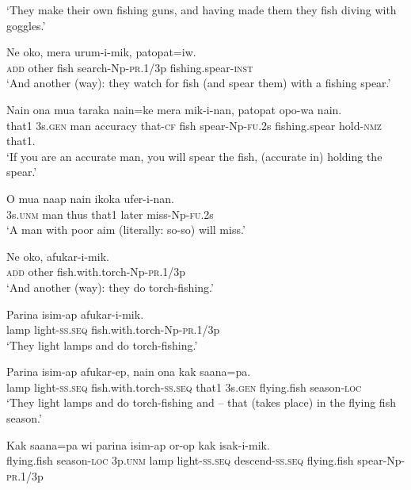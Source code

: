 \glt ‘They make their own fishing guns, and having made them they fish diving with goggles.’ \\
\z


\ea
\gll  Ne  oko,  mera  urum-i-mik,  patopat=iw. \\
\textsc{add}  other  fish  search-Np-\textsc{pr}.1/3p  fishing.spear-\textsc{inst} \\
\glt ‘And another (way): they watch for fish (and spear them) with a fishing spear.’ \\
\z


\ea
\gll  Nain  ona  mua  taraka  nain=ke  mera  mik-i-nan,       patopat  opo-wa  nain. \\
that1  3s.\textsc{gen}  man  accuracy  that-\textsc{cf}  fish  spear-Np-\textsc{fu}.2s   fishing.spear  hold-\textsc{nmz}  that1. \\


\glt ‘If you are an accurate man, you will spear the fish, (accurate in) holding the spear.’ \\
\z


\ea
\gll  O  mua  naap  nain  ikoka  ufer-i-nan. \\
3s.\textsc{unm}  man  thus  that1  later  miss-Np-\textsc{fu}.2s \\
\glt ‘A man with poor aim (literally: so-so) will miss.’ \\
\z


\ea
\gll  Ne  oko,  afukar-i-mik. \\
\textsc{add}  other  fish.with.torch-Np-\textsc{pr}.1/3p \\
\glt ‘And another (way): they do torch-fishing.’ \\
\z


\ea
\gll  Parina  isim-ap  afukar-i-mik. \\
lamp  light-\textsc{ss.seq}  fish.with.torch-Np-\textsc{pr}.1/3p \\
\glt ‘They light lamps and do torch-fishing.’ \\
\z


\ea
\gll  Parina  isim-ap  afukar-ep,  nain            ona  kak  saana=pa. \\
lamp  light-\textsc{ss.seq}  fish.with.torch-\textsc{ss.seq}  that1  3s.\textsc{gen}  flying.fish  season-\textsc{loc} \\


\glt ‘They light lamps and do torch-fishing and – that (takes place) in the flying fish season.’ \\
\z


\ea
\gll  Kak  saana=pa  wi  parina  isim-ap              or-op  kak  isak-i-mik. \\
flying.fish  season-\textsc{loc}  3p.\textsc{unm}  lamp  light-\textsc{ss.seq}   descend-\textsc{ss.seq}  flying.fish  spear-Np-\textsc{pr}.1/3p \\


